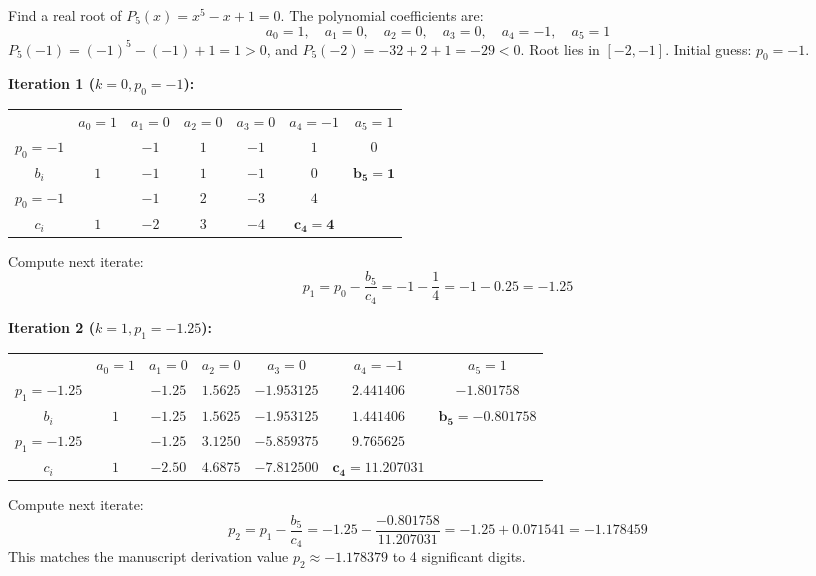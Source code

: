 \begin{examplebox}[Manuscript Problem: Complete Solution of $x^5 - x + 1 = 0$ (Pages 22--23)]
Find a real root of $P_5(x) = x^5 - x + 1 = 0$.
The polynomial coefficients are:
\begin{equation}
    a_0 = 1, \quad a_1 = 0, \quad a_2 = 0, \quad a_3 = 0, \quad a_4 = -1, \quad a_5 = 1
\end{equation}
$P_5(-1) = (-1)^5 - (-1) + 1 = 1 > 0$, and $P_5(-2) = -32 + 2 + 1 = -29 < 0$. Root lies in $[-2, -1]$.
Initial guess: $p_0 = -1$.

\textbf{Iteration 1 ($k = 0, p_0 = -1$):}
\begin{center}
\renewcommand{\arraystretch}{1.2}
\begin{tabular}{c|cccccc}
& $a_0 = 1$ & $a_1 = 0$ & $a_2 = 0$ & $a_3 = 0$ & $a_4 = -1$ & $a_5 = 1$ \\
$p_0 = -1$ & & $-1$ & $1$ & $-1$ & $1$ & $0$ \\
\hline
$b_i$ & $1$ & $-1$ & $1$ & $-1$ & $0$ & $\mathbf{b_5 = 1}$ \\
$p_0 = -1$ & & $-1$ & $2$ & $-3$ & $4$ & \\
\hline
$c_i$ & $1$ & $-2$ & $3$ & $-4$ & $\mathbf{c_4 = 4}$ &
\end{tabular}
\end{center}
Compute next iterate:
\begin{equation}
    p_1 = p_0 - \frac{b_5}{c_4} = -1 - \frac{1}{4} = -1 - 0.25 = \mathbf{-1.25}
\end{equation}

\textbf{Iteration 2 ($k = 1, p_1 = -1.25$):}
\begin{center}
\small
\renewcommand{\arraystretch}{1.25}
\begin{tabular}{c|cccccc}
& $a_0 = 1$ & $a_1 = 0$ & $a_2 = 0$ & $a_3 = 0$ & $a_4 = -1$ & $a_5 = 1$ \\
$p_1 = -1.25$ & & $-1.25$ & $1.5625$ & $-1.953125$ & $2.441406$ & $-1.801758$ \\
\hline
$b_i$ & $1$ & $-1.25$ & $1.5625$ & $-1.953125$ & $1.441406$ & $\mathbf{b_5 = -0.801758}$ \\
$p_1 = -1.25$ & & $-1.25$ & $3.1250$ & $-5.859375$ & $9.765625$ & \\
\hline
$c_i$ & $1$ & $-2.50$ & $4.6875$ & $-7.812500$ & $\mathbf{c_4 = 11.207031}$ &
\end{tabular}
\end{center}
Compute next iterate:
\begin{equation}
    p_2 = p_1 - \frac{b_5}{c_4} = -1.25 - \frac{-0.801758}{11.207031} = -1.25 + 0.071541 = \mathbf{-1.178459}
\end{equation}
This matches the manuscript derivation value $p_2 \approx -1.178379$ to 4 significant digits.
\end{examplebox}
